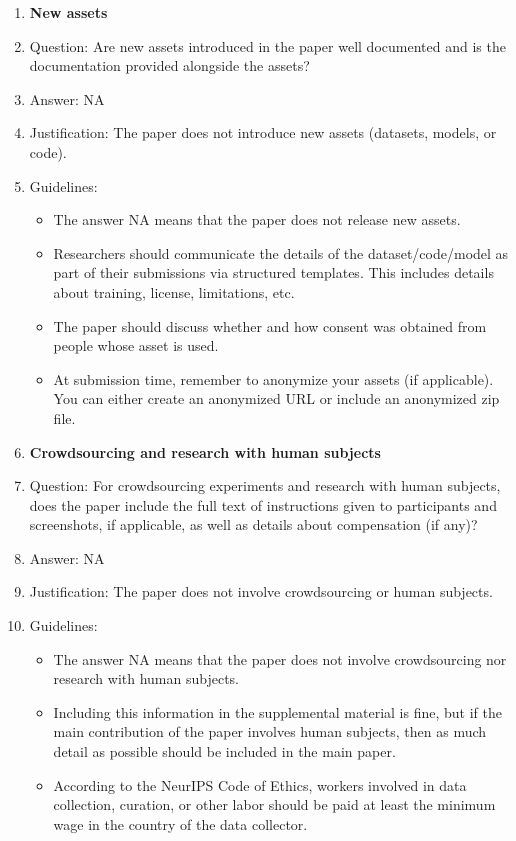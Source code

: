 \documentclass{article}
\newcommand{\answerNA}[1][]{NA}
\begin{document}
\begin{enumerate}
\item {\bf New assets}
    \item[] Question: Are new assets introduced in the paper well documented and is the documentation provided alongside the assets?
    \item[] Answer: \answerNA{}
    \item[] Justification: The paper does not introduce new assets (datasets, models, or code).
    \item[] Guidelines:
    \begin{itemize}
        \item The answer NA means that the paper does not release new assets.
        \item Researchers should communicate the details of the dataset/code/model as part of their submissions via structured templates. This includes details about training, license, limitations, etc. 
        \item The paper should discuss whether and how consent was obtained from people whose asset is used.
        \item At submission time, remember to anonymize your assets (if applicable). You can either create an anonymized URL or include an anonymized zip file.
    \end{itemize}

\item {\bf Crowdsourcing and research with human subjects}
    \item[] Question: For crowdsourcing experiments and research with human subjects, does the paper include the full text of instructions given to participants and screenshots, if applicable, as well as details about compensation (if any)? 
    \item[] Answer: \answerNA{}
    \item[] Justification: The paper does not involve crowdsourcing or human subjects.
    \item[] Guidelines:
    \begin{itemize}
        \item The answer NA means that the paper does not involve crowdsourcing nor research with human subjects.
        \item Including this information in the supplemental material is fine, but if the main contribution of the paper involves human subjects, then as much detail as possible should be included in the main paper. 
        \item According to the NeurIPS Code of Ethics, workers involved in data collection, curation, or other labor should be paid at least the minimum wage in the country of the data collector. 
    \end{itemize}


\end{enumerate}
\end{document}
